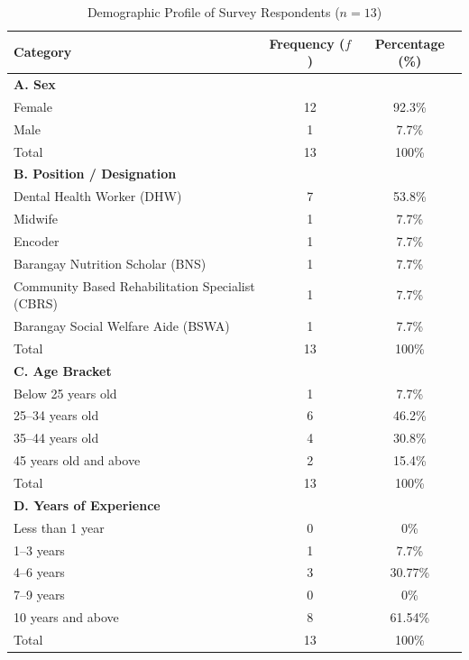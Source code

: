 \documentclass{research}
\begin{document}
\begin{table}[H]
  \centering
  \caption{Demographic Profile of Survey Respondents ($n = 13$)}
  \label{tab:demographics}
  \begin{tabular}{lcc}
    \toprule
    \textbf{Category} & \textbf{Frequency ($f$)} & \textbf{Percentage (\%)} \\
    \midrule
    \multicolumn{3}{l}{\textbf{A. Sex}} \\
    Female & 12 & 92.3\% \\
    Male   & 1  & 7.7\%  \\
    Total  & 13 & 100\%  \\
    \midrule
    \multicolumn{3}{l}{\textbf{B. Position / Designation}} \\
    Dental Health Worker (DHW)                      & 7 & 53.8\% \\
    Midwife                                          & 1 & 7.7\%  \\
    Encoder                                          & 1 & 7.7\%  \\
    Barangay Nutrition Scholar (BNS)                 & 1 & 7.7\%  \\
    Community Based Rehabilitation Specialist (CBRS) & 1 & 7.7\%  \\
    Barangay Social Welfare Aide (BSWA)              & 1 & 7.7\%  \\
    Total                                            & 13 & 100\% \\
    \midrule
    \multicolumn{3}{l}{\textbf{C. Age Bracket}} \\
    Below 25 years old    & 1  & 7.7\%  \\
    25--34 years old      & 6  & 46.2\% \\
    35--44 years old      & 4  & 30.8\% \\
    45 years old and above & 2 & 15.4\% \\
    Total                 & 13 & 100\%  \\
    \midrule
    \multicolumn{3}{l}{\textbf{D. Years of Experience}} \\
    Less than 1 year  & 0  & 0\%     \\
    1--3 years        & 1  & 7.7\%   \\
    4--6 years        & 3  & 30.77\% \\
    7--9 years        & 0  & 0\%     \\
    10 years and above & 8 & 61.54\% \\
    Total             & 13 & 100\%   \\
    \bottomrule
  \end{tabular}
\end{table}
\end{document}
